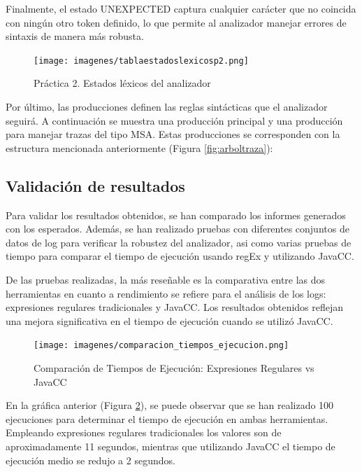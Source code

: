 Finalmente, el estado UNEXPECTED captura cualquier carácter que no coincida con ningún otro token definido, lo que permite al analizador manejar errores de sintaxis de manera más robusta.

\begin{figure}[H]
	\centering
	\texttt{[image: imagenes/tablaestadoslexicosp2.png]}
	\caption{\label{fig:tablaestadoslexicosp2}Práctica 2. Estados léxicos del analizador}
\end{figure}

Por último, las producciones definen las reglas sintácticas que el analizador seguirá. A continuación se muestra una producción principal y una producción para manejar trazas del tipo MSA. Estas producciones se corresponden con la estructura mencionada anteriormente (Figura \ref{fig:arboltraza}):

\lstset{inputencoding=utf8/latin1}


\subsection{Validación de resultados}

\noindent Para validar los resultados obtenidos, se han comparado los informes generados con los esperados. Además, se han realizado pruebas con diferentes conjuntos de datos de log para verificar la robustez del analizador, asi como varias pruebas de tiempo para comparar el tiempo de ejecución usando regEx y utilizando JavaCC. 

De las pruebas realizadas, la más reseñable es la comparativa entre las dos herramientas en cuanto a rendimiento se refiere para el análisis de los logs: expresiones regulares tradicionales y JavaCC. Los resultados obtenidos reflejan una mejora significativa en el tiempo de ejecución cuando se utilizó JavaCC.

\begin{figure}[H]
\centering
\texttt{[image: imagenes/comparacion\_tiempos\_ejecucion.png]}
\caption{Comparación de Tiempos de Ejecución: Expresiones Regulares vs JavaCC}
\label{fig:comparacion_tiempos_ejecucion.png}
\end{figure}

\noindent En la gráfica anterior (Figura \ref{fig:comparacion_tiempos_ejecucion.png}), se puede observar que se han realizado 100 ejecuciones para determinar el tiempo de ejecución en ambas herramientas. Empleando expresiones regulares tradicionales los valores son de aproximadamente 11 segundos, mientras que utilizando JavaCC el tiempo de ejecución medio se redujo a 2 segundos.


